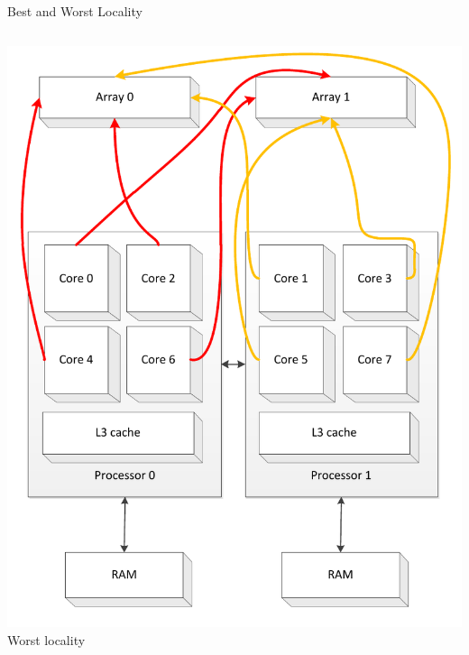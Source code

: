 \begin{frame}{Best and Worst Locality}
\begin{columns}[c]
\begin{column}{0.50\textwidth}
\begin{center}
        \includegraphics[width=\textwidth]{figures/cache-stress-test-mafushi-threads-worst} \\
        \tiny{Worst locality}
      \end{center}
    \end{column}
  \end{columns}
\end{frame}

